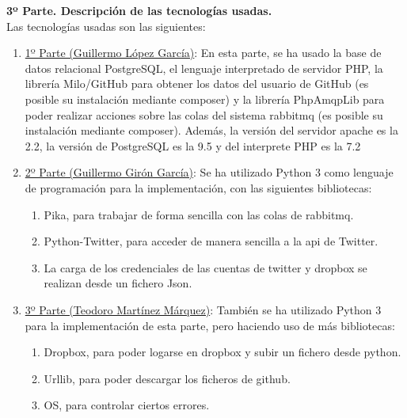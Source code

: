 \documentclass{article}
\begin{document}
\textbf{3º Parte. Descripción de las tecnologías usadas.}\\
Las tecnologías usadas son las siguientes:
\begin{enumerate}
    \item \underline{1º Parte (Guillermo López García)}: En esta parte, se ha usado
        la base de datos relacional PostgreSQL, el lenguaje interpretado de servidor
        PHP, la librería Milo/GitHub para obtener los datos del usuario de GitHub
        (es posible su instalación mediante composer) y la librería PhpAmqpLib para
        poder realizar acciones sobre las colas del sistema rabbitmq (es posible su
        instalación mediante composer). Además, la versión del servidor apache es la
        2.2, la versión de PostgreSQL es la 9.5 y del interprete PHP es la 7.2
    \item \underline{2º Parte (Guillermo Girón García)}: Se ha utilizado Python 3 como
    lenguaje de programación para la implementación, con las siguientes bibliotecas:
    \begin{enumerate}
        \item Pika, para trabajar de forma sencilla con las colas de rabbitmq. 
        \item Python-Twitter, para acceder de manera sencilla a la api de Twitter. 
        \item La carga de los credenciales de las cuentas de twitter y dropbox se realizan desde un fichero Json.
    \end{enumerate} 
    \item \underline{3º Parte (Teodoro Martínez Márquez)}: También se ha utilizado Python 3 	para la implementación de esta parte, pero haciendo uso de más bibliotecas:
    \begin{enumerate}
	\item Dropbox, para poder logarse en dropbox y subir un fichero desde python.
	\item Urllib, para poder descargar los ficheros de github.
	\item OS, para controlar ciertos errores.
	
\end{enumerate}


\end{enumerate}
\end{document}
